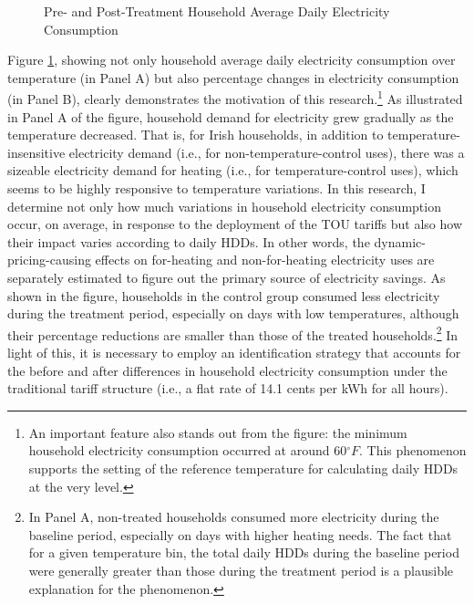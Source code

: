 \begin{figure}[!htbp]
\centering
\caption{Pre- and Post-Treatment Household Average Daily Electricity Consumption}
\label{Figure:Pre-and-Post-Treatment-Household-Average-Daily-Electricity-Consumption}
\end{figure}

Figure \ref{Figure:Pre-and-Post-Treatment-Household-Average-Daily-Electricity-Consumption}, showing not only household average daily electricity consumption over temperature (in Panel A) but also percentage changes in electricity consumption (in Panel B), clearly demonstrates the motivation of this research.\footnote{An important feature also stands out from the figure: the minimum household electricity consumption occurred at around 60$^{\circ}F$. This phenomenon supports the setting of the reference temperature for calculating daily HDDs at the very level.} As illustrated in Panel A of the figure, household demand for electricity grew gradually as the temperature decreased. That is, for Irish households, in addition to temperature-insensitive electricity demand (i.e., for non-temperature-control uses), there was a sizeable electricity demand for heating (i.e., for temperature-control uses), which seems to be highly responsive to temperature variations. In this research, I determine not only how much variations in household electricity consumption occur, on average, in response to the deployment of the TOU tariffs but also how their impact varies according to daily HDDs. In other words, the dynamic-pricing-causing effects on for-heating and non-for-heating electricity uses are separately estimated to figure out the primary source of electricity savings. As shown in the figure, households in the control group consumed less electricity during the treatment period, especially on days with low temperatures, although their percentage reductions are smaller than those of the treated households.\footnote{In Panel A, non-treated households consumed more electricity during the baseline period, especially on days with higher heating needs. The fact that for a given temperature bin, the total daily HDDs during the baseline period were generally greater than those during the treatment period is a plausible explanation for the phenomenon.} In light of this, it is necessary to employ an identification strategy that accounts for the before and after differences in household electricity consumption under the traditional tariff structure (i.e., a flat rate of 14.1 cents per kWh for all hours). 

